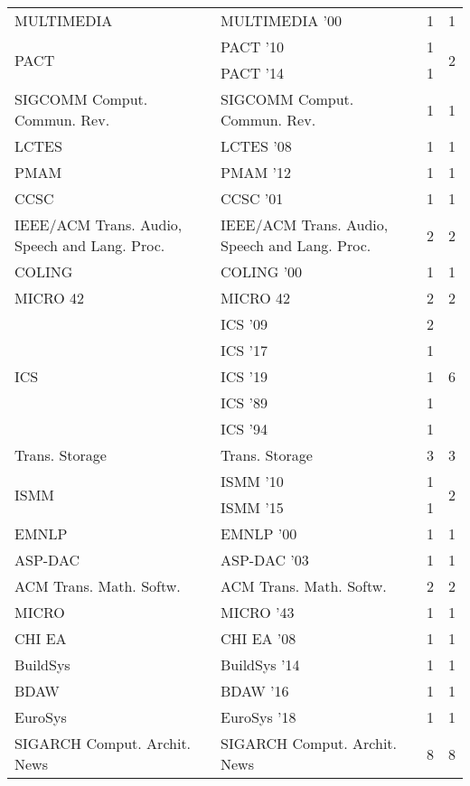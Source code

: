 \begin{table*}[t]
\begin{tabular}{llrr}
\multirow{1}{*}{MULTIMEDIA } & MULTIMEDIA '00 & 1 & \multirow{1}{*}{1}\\
\multirow{2}{*}{PACT } & PACT '10 & 1 & \multirow{2}{*}{2}\\
& PACT '14 & 1 &\\
\multirow{1}{*}{SIGCOMM Comput. Commun. Rev.} & SIGCOMM Comput. Commun. Rev. & 1 & \multirow{1}{*}{1}\\
\multirow{1}{*}{LCTES } & LCTES '08 & 1 & \multirow{1}{*}{1}\\
\multirow{1}{*}{PMAM } & PMAM '12 & 1 & \multirow{1}{*}{1}\\
\multirow{1}{*}{CCSC } & CCSC '01 & 1 & \multirow{1}{*}{1}\\
\multirow{1}{*}{IEEE/ACM Trans. Audio, Speech and Lang. Proc.} & IEEE/ACM Trans. Audio, Speech and Lang. Proc. & 2 & \multirow{1}{*}{2}\\
\multirow{1}{*}{COLING } & COLING '00 & 1 & \multirow{1}{*}{1}\\
\multirow{1}{*}{MICRO 42} & MICRO 42 & 2 & \multirow{1}{*}{2}\\
\multirow{5}{*}{ICS } & ICS '09 & 2 & \multirow{5}{*}{6}\\
& ICS '17 & 1 &\\
& ICS '19 & 1 &\\
& ICS '89 & 1 &\\
& ICS '94 & 1 &\\
\multirow{1}{*}{Trans. Storage} & Trans. Storage & 3 & \multirow{1}{*}{3}\\
\multirow{2}{*}{ISMM } & ISMM '10 & 1 & \multirow{2}{*}{2}\\
& ISMM '15 & 1 &\\
\multirow{1}{*}{EMNLP } & EMNLP '00 & 1 & \multirow{1}{*}{1}\\
\multirow{1}{*}{ASP-DAC } & ASP-DAC '03 & 1 & \multirow{1}{*}{1}\\
\multirow{1}{*}{ACM Trans. Math. Softw.} & ACM Trans. Math. Softw. & 2 & \multirow{1}{*}{2}\\
\multirow{1}{*}{MICRO } & MICRO '43 & 1 & \multirow{1}{*}{1}\\
\multirow{1}{*}{CHI EA } & CHI EA '08 & 1 & \multirow{1}{*}{1}\\
\multirow{1}{*}{BuildSys } & BuildSys '14 & 1 & \multirow{1}{*}{1}\\
\multirow{1}{*}{BDAW } & BDAW '16 & 1 & \multirow{1}{*}{1}\\
\multirow{1}{*}{EuroSys } & EuroSys '18 & 1 & \multirow{1}{*}{1}\\
\multirow{1}{*}{SIGARCH Comput. Archit. News} & SIGARCH Comput. Archit. News & 8 & \multirow{1}{*}{8}\\

\end{tabular}
\end{table*}
